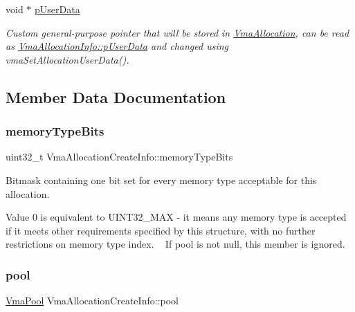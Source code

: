\begin{DoxyCompactItemize}
void $\ast$ \hyperlink{structVmaAllocationCreateInfo_a8259e85c272683434f4abb4ddddffe19}{p\+User\+Data}
\begin{DoxyCompactList}\small\item\em Custom general-\/purpose pointer that will be stored in \hyperlink{structVmaAllocation}{Vma\+Allocation}, can be read as \hyperlink{structVmaAllocationInfo_adc507656149c04de7ed95d0042ba2a13}{Vma\+Allocation\+Info\+::p\+User\+Data} and changed using vma\+Set\+Allocation\+User\+Data(). \end{DoxyCompactList}\end{DoxyCompactItemize}


\subsection{Member Data Documentation}
\mbox{\label{structVmaAllocationCreateInfo_a3bf940c0271d85d6ba32a4d820075055}} 
\subsubsection{\texorpdfstring{memory\+Type\+Bits}{memoryTypeBits}}
{\footnotesize\ttfamily uint32\+\_\+t Vma\+Allocation\+Create\+Info\+::memory\+Type\+Bits}



Bitmask containing one bit set for every memory type acceptable for this allocation. 

Value 0 is equivalent to {\ttfamily U\+I\+N\+T32\+\_\+\+M\+AX} -\/ it means any memory type is accepted if it meets other requirements specified by this structure, with no further restrictions on memory type index. ~\newline
If {\ttfamily pool} is not null, this member is ignored. \mbox{\label{structVmaAllocationCreateInfo_a6272c0555cfd1fe28bff1afeb6190150}} 
\subsubsection{\texorpdfstring{pool}{pool}}
{\footnotesize\ttfamily \hyperlink{structVmaPool}{Vma\+Pool} Vma\+Allocation\+Create\+Info\+::pool}




